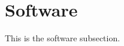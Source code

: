 \documentclass[../vccs_documentation]{subfiles}
\begin{document}
\section{Software}
This is the software subsection.
\end{document}
